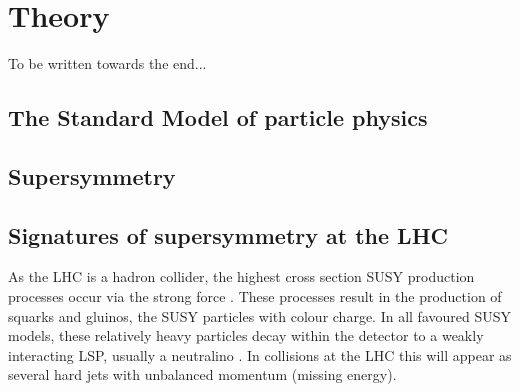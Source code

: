 \chapter{Theory}
\label{chap:theory}


To be written towards the end...

\section{The Standard Model of particle physics}
\label{sec:sm}


\section{Supersymmetry}
\label{sec:susy}


\section{Signatures of supersymmetry at the LHC}

As the LHC is a hadron collider, the highest cross section SUSY
production processes occur via the strong force
\cite{Martin:1997ns}
\cite{SUSYxsections_NewAspectsof_pp_collisions}. These processes
result in the production of squarks and gluinos, the SUSY particles
with colour charge. In all favoured SUSY models, these relatively
heavy particles decay within the detector to a weakly interacting LSP,
usually a neutralino \cite{Farrar:1978xj}. In
collisions at the LHC this will appear as several hard jets with
unbalanced momentum (missing energy). 

